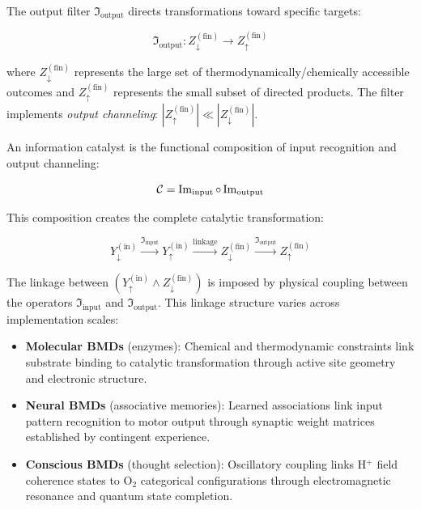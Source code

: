 \begin{definition}
The output filter \(\Im_{\text{output}}\) directs transformations toward specific targets:

\begin{equation}
\Im_{\text{output}}: Z_{\downarrow}^{(\text{fin})} \to Z_{\uparrow}^{(\text{fin})}
\end{equation}

where \(Z_{\downarrow}^{(\text{fin})}\) represents the large set of thermodynamically/chemically accessible outcomes and \(Z_{\uparrow}^{(\text{fin})}\) represents the small subset of directed products. The filter implements \textit{output channeling}: \(|Z_{\uparrow}^{(\text{fin})}| \ll |Z_{\downarrow}^{(\text{fin})}|\).
\end{definition}

\begin{definition}
An information catalyst is the functional composition of input recognition and output channeling:

\begin{equation}
\mathcal{C} = \Im_{\text{input}} \circ \Im_{\text{output}}
\end{equation}

This composition creates the complete catalytic transformation:

\begin{equation}
Y_{\downarrow}^{(\text{in})} \xrightarrow{\Im_{\text{input}}} Y_{\uparrow}^{(\text{in})} \xrightarrow{\text{linkage}} Z_{\downarrow}^{(\text{fin})} \xrightarrow{\Im_{\text{output}}} Z_{\uparrow}^{(\text{fin})}
\end{equation}
\end{definition}

The linkage between \((Y_{\uparrow}^{(\text{in})} \wedge Z_{\downarrow}^{(\text{fin})})\) is imposed by physical coupling between the operators \(\Im_{\text{input}}\) and \(\Im_{\text{output}}\). This linkage structure varies across implementation scales:

\begin{itemize}
\item \textbf{Molecular BMDs} (enzymes): Chemical and thermodynamic constraints link substrate binding to catalytic transformation through active site geometry and electronic structure.

\item \textbf{Neural BMDs} (associative memories): Learned associations link input pattern recognition to motor output through synaptic weight matrices established by contingent experience.

\item \textbf{Conscious BMDs} (thought selection): Oscillatory coupling links H\(^+\) field coherence states to O\(_2\) categorical configurations through electromagnetic resonance and quantum state completion.
\end{itemize}

